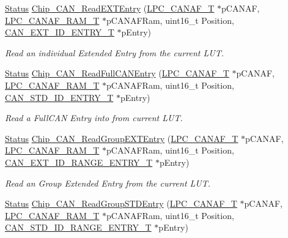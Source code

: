 \begin{DoxyCompactItemize}
\hyperlink{group__LPC__Types__Public__Types_ga67a0db04d321a74b7e7fcfd3f1a3f70b}{Status} \hyperlink{group__CAN__17XX__40XX_gad8bbd206134607402721450d085e3ccf}{Chip\+\_\+\+C\+A\+N\+\_\+\+Read\+E\+X\+T\+Entry} (\hyperlink{structLPC__CANAF__T}{L\+P\+C\+\_\+\+C\+A\+N\+A\+F\+\_\+T} $\ast$p\+C\+A\+N\+AF, \hyperlink{structLPC__CANAF__RAM__T}{L\+P\+C\+\_\+\+C\+A\+N\+A\+F\+\_\+\+R\+A\+M\+\_\+T} $\ast$p\+C\+A\+N\+A\+F\+Ram, uint16\+\_\+t Position, \hyperlink{structCAN__EXT__ID__ENTRY__T}{C\+A\+N\+\_\+\+E\+X\+T\+\_\+\+I\+D\+\_\+\+E\+N\+T\+R\+Y\+\_\+T} $\ast$p\+Entry)
\begin{DoxyCompactList}\small\item\em Read an individual Extended Entry from the current L\+UT. \end{DoxyCompactList}\item 
\hyperlink{group__LPC__Types__Public__Types_ga67a0db04d321a74b7e7fcfd3f1a3f70b}{Status} \hyperlink{group__CAN__17XX__40XX_gac54b6ced8b370416a071912bd08a0091}{Chip\+\_\+\+C\+A\+N\+\_\+\+Read\+Full\+C\+A\+N\+Entry} (\hyperlink{structLPC__CANAF__T}{L\+P\+C\+\_\+\+C\+A\+N\+A\+F\+\_\+T} $\ast$p\+C\+A\+N\+AF, \hyperlink{structLPC__CANAF__RAM__T}{L\+P\+C\+\_\+\+C\+A\+N\+A\+F\+\_\+\+R\+A\+M\+\_\+T} $\ast$p\+C\+A\+N\+A\+F\+Ram, uint16\+\_\+t Position, \hyperlink{structCAN__STD__ID__ENTRY__T}{C\+A\+N\+\_\+\+S\+T\+D\+\_\+\+I\+D\+\_\+\+E\+N\+T\+R\+Y\+\_\+T} $\ast$p\+Entry)
\begin{DoxyCompactList}\small\item\em Read a Full\+C\+AN Entry into from current L\+UT. \end{DoxyCompactList}\item 
\hyperlink{group__LPC__Types__Public__Types_ga67a0db04d321a74b7e7fcfd3f1a3f70b}{Status} \hyperlink{group__CAN__17XX__40XX_ga230f718177c73eab776ae534906b5c9a}{Chip\+\_\+\+C\+A\+N\+\_\+\+Read\+Group\+E\+X\+T\+Entry} (\hyperlink{structLPC__CANAF__T}{L\+P\+C\+\_\+\+C\+A\+N\+A\+F\+\_\+T} $\ast$p\+C\+A\+N\+AF, \hyperlink{structLPC__CANAF__RAM__T}{L\+P\+C\+\_\+\+C\+A\+N\+A\+F\+\_\+\+R\+A\+M\+\_\+T} $\ast$p\+C\+A\+N\+A\+F\+Ram, uint16\+\_\+t Position, \hyperlink{structCAN__EXT__ID__RANGE__ENTRY__T}{C\+A\+N\+\_\+\+E\+X\+T\+\_\+\+I\+D\+\_\+\+R\+A\+N\+G\+E\+\_\+\+E\+N\+T\+R\+Y\+\_\+T} $\ast$p\+Entry)
\begin{DoxyCompactList}\small\item\em Read an Group Extended Entry from the current L\+UT. \end{DoxyCompactList}\item 
\hyperlink{group__LPC__Types__Public__Types_ga67a0db04d321a74b7e7fcfd3f1a3f70b}{Status} \hyperlink{group__CAN__17XX__40XX_ga1d8da3b3270e092f42dbe9e61f025b06}{Chip\+\_\+\+C\+A\+N\+\_\+\+Read\+Group\+S\+T\+D\+Entry} (\hyperlink{structLPC__CANAF__T}{L\+P\+C\+\_\+\+C\+A\+N\+A\+F\+\_\+T} $\ast$p\+C\+A\+N\+AF, \hyperlink{structLPC__CANAF__RAM__T}{L\+P\+C\+\_\+\+C\+A\+N\+A\+F\+\_\+\+R\+A\+M\+\_\+T} $\ast$p\+C\+A\+N\+A\+F\+Ram, uint16\+\_\+t Position, \hyperlink{structCAN__STD__ID__RANGE__ENTRY__T}{C\+A\+N\+\_\+\+S\+T\+D\+\_\+\+I\+D\+\_\+\+R\+A\+N\+G\+E\+\_\+\+E\+N\+T\+R\+Y\+\_\+T} $\ast$p\+Entry)

\end{DoxyCompactItemize}
